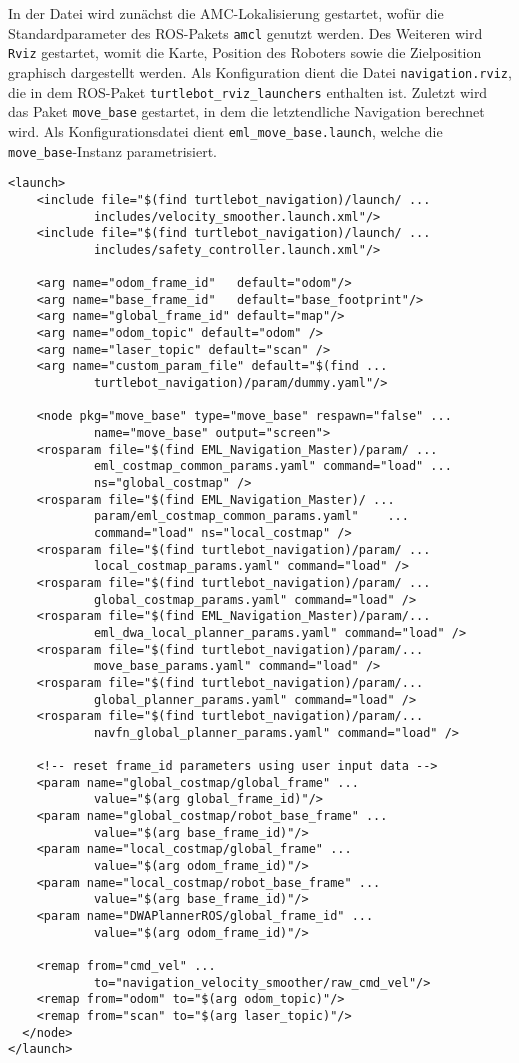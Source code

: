 In der Datei wird zunächst die AMC-Lokalisierung gestartet, wofür die Standardparameter des ROS-Pakets \lstinline{amcl} \cite{WikiAMCL} genutzt werden. Des Weiteren wird \lstinline{Rviz}{} gestartet, womit die Karte, Position des Roboters sowie die Zielposition graphisch dargestellt werden. Als Konfiguration dient die Datei \lstinline{navigation.rviz}{}, die in dem ROS-Paket \lstinline{turtlebot_rviz_launchers} \cite{WikiRVIZLaunchers} enthalten ist. Zuletzt wird das Paket \lstinline{move_base} \cite{WikiMoveBase} gestartet, in dem die letztendliche Navigation berechnet wird. Als Konfigurationsdatei dient \lstinline{eml_move_base.launch}{}, welche die \lstinline{move_base}{}-Instanz parametrisiert.
\begin{lstlisting}[caption={eml\_move\_base.launch},captionpos=b]
<launch>
	<include file="$(find turtlebot_navigation)/launch/ ...
			includes/velocity_smoother.launch.xml"/>
	<include file="$(find turtlebot_navigation)/launch/ ...
			includes/safety_controller.launch.xml"/>
  
	<arg name="odom_frame_id"   default="odom"/>
	<arg name="base_frame_id"   default="base_footprint"/>
	<arg name="global_frame_id" default="map"/>
	<arg name="odom_topic" default="odom" />
	<arg name="laser_topic" default="scan" />
	<arg name="custom_param_file" default="$(find ...
			turtlebot_navigation)/param/dummy.yaml"/>

	<node pkg="move_base" type="move_base" respawn="false" ...
			name="move_base" output="screen">
	<rosparam file="$(find EML_Navigation_Master)/param/ ...
			eml_costmap_common_params.yaml" command="load" ...
			ns="global_costmap" />
	<rosparam file="$(find EML_Navigation_Master)/ ...
			param/eml_costmap_common_params.yaml"    ...
			command="load" ns="local_costmap" />   
	<rosparam file="$(find turtlebot_navigation)/param/ ...
			local_costmap_params.yaml" command="load" />   
	<rosparam file="$(find turtlebot_navigation)/param/ ...
			global_costmap_params.yaml" command="load" />
	<rosparam file="$(find EML_Navigation_Master)/param/...
			eml_dwa_local_planner_params.yaml" command="load" />
	<rosparam file="$(find turtlebot_navigation)/param/...
			move_base_params.yaml" command="load" />
	<rosparam file="$(find turtlebot_navigation)/param/...
			global_planner_params.yaml" command="load" />
	<rosparam file="$(find turtlebot_navigation)/param/...
			navfn_global_planner_params.yaml" command="load" />
	    
	<!-- reset frame_id parameters using user input data -->
	<param name="global_costmap/global_frame" ...
			value="$(arg global_frame_id)"/>
	<param name="global_costmap/robot_base_frame" ...
			value="$(arg base_frame_id)"/>
    <param name="local_costmap/global_frame" ...
    		value="$(arg odom_frame_id)"/>
    <param name="local_costmap/robot_base_frame" ...
    		value="$(arg base_frame_id)"/>
    <param name="DWAPlannerROS/global_frame_id" ...
    		value="$(arg odom_frame_id)"/>

    <remap from="cmd_vel" ...
    		to="navigation_velocity_smoother/raw_cmd_vel"/>
    <remap from="odom" to="$(arg odom_topic)"/>
    <remap from="scan" to="$(arg laser_topic)"/>
  </node>
</launch>
\end{lstlisting}
